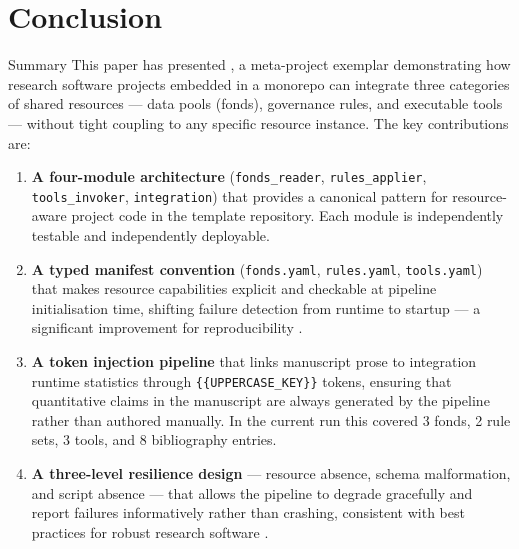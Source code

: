 \documentclass[
  ignorenonframetext,
]{beamer}
\author{\texorpdfstring{}{}}
\date{}
\begin{document}
\section{Conclusion}\label{sec:conclusion}

\begin{frame}{Summary}
\protect{}\label{summary}
This paper has presented , a
meta-project exemplar demonstrating how research software projects
embedded in a monorepo can integrate three categories of shared
resources --- data pools (fonds), governance rules, and executable tools
--- without tight coupling to any specific resource instance. The key
contributions are:

\begin{enumerate}
\item
  \textbf{A four-module architecture} (\texttt{fonds\_reader},
  \texttt{rules\_applier}, \texttt{tools\_invoker},
  \texttt{integration}) that provides a canonical pattern for
  resource-aware project code in the template repository. Each module is
  independently testable and independently deployable.
\item
  \textbf{A typed manifest convention} (\texttt{fonds.yaml},
  \texttt{rules.yaml}, \texttt{tools.yaml}) that makes resource
  capabilities explicit and checkable at pipeline initialisation time,
  shifting failure detection from runtime to startup --- a significant
  improvement for reproducibility .
\item
  \textbf{A token injection pipeline} that links manuscript prose to
  integration runtime statistics through \texttt{\{\{UPPERCASE\_KEY\}\}}
  tokens, ensuring that quantitative claims in the manuscript are always
  generated by the pipeline rather than authored manually. In the
  current run this covered 3 fonds, 2 rule sets, 3 tools, and 8
  bibliography entries.
\item
  \textbf{A three-level resilience design} --- resource absence, schema
  malformation, and script absence --- that allows the pipeline to
  degrade gracefully and report failures informatively rather than
  crashing, consistent with best practices for robust research software
  .
\end{enumerate}
\end{frame}
\end{document}
